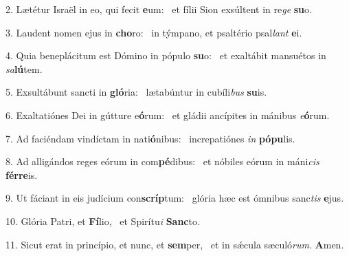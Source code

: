 2. Lætétur Israël in eo, qui fecit \textbf{e}um: \ast\  et fílii Sion exsúltent in re\textit{ge} \textbf{su}o.\

3. Laudent nomen ejus in \textbf{cho}ro: \ast\  in týmpano, et psaltério psal\textit{lant} \textbf{e}i.\

4. Quia beneplácitum est Dómino in pópulo \textbf{su}o: \ast\  et exaltábit mansuétos in \textit{sa}\textbf{lú}tem.\

5. Exsultábunt sancti in \textbf{gló}ria: \ast\  lætabúntur in cubíli\textit{bus} \textbf{su}is.\

6. Exaltatiónes Dei in gútture e\textbf{ó}rum: \ast\  et gládii ancípites in mánibus \textit{e}\textbf{ó}rum.\

7. Ad faciéndam vindíctam in nati\textbf{ó}nibus: \ast\  increpatiónes \textit{in} \textbf{pó}\textbf{pu}lis.\

8. Ad alligándos reges eórum in com\textbf{pé}dibus: \ast\  et nóbiles eórum in máni\textit{cis} \textbf{fér}\textbf{re}is.\

9. Ut fáciant in eis judícium con\textbf{scríp}tum: \ast\  glória hæc est ómnibus sanc\textit{tis} \textbf{e}jus.\

10. Glória Patri, et \textbf{Fí}lio, \ast\  et Spirítu\textit{i} \textbf{Sanc}to.\

11. Sicut erat in princípio, et nunc, et \textbf{sem}per, \ast\  et in sǽcula sæculó\textit{rum}. \textbf{A}men.\

